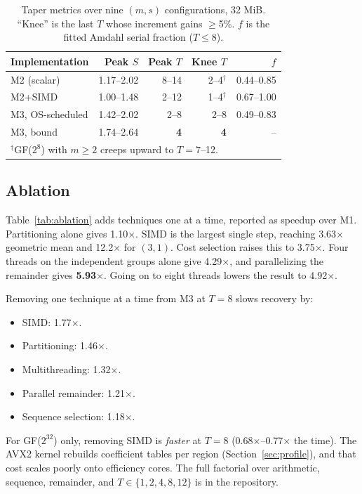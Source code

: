 \documentclass[conference]{IEEEtran}
\begin{document}
\begin{table}[t]
\caption{Taper metrics over nine $(m,s)$ configurations, 32 MiB. ``Knee'' is the last $T$ whose increment gains $\ge$5\%. $f$ is the fitted Amdahl serial fraction ($T\le8$).}
\label{tab:taper}
\centering
\footnotesize
\setlength{\tabcolsep}{3pt}
\begin{tabular}{l rrrr}
\hline
Implementation & Peak $S$ & Peak $T$ & Knee $T$ & $f$\\
\hline
M2 (scalar) & 1.17--2.02 & 8--14 & 2--4$^\dagger$ & 0.44--0.85\\
M2+SIMD & 1.00--1.48 & 2--12 & 1--4$^\dagger$ & 0.67--1.00\\
M3, OS-scheduled & 1.42--2.02 & 2--8 & 2--8 & 0.49--0.83\\
M3, bound & 1.74--2.64 & \textbf{4} & \textbf{4} & --\\
\hline
\multicolumn{5}{l}{$^\dagger$GF($2^8$) with $m\ge2$ creeps upward to $T=7$--12.}\\
\end{tabular}
\end{table}

\subsection{Ablation}
Table~\ref{tab:ablation} adds techniques one at a time, reported as speedup over M1. Partitioning alone gives 1.10$\times$. SIMD is the largest single step, reaching 3.63$\times$ geometric mean and 12.2$\times$ for $(3,1)$. Cost selection raises this to 3.75$\times$. Four threads on the independent groups alone give 4.29$\times$, and parallelizing the remainder gives \textbf{5.93$\times$}. Going on to eight threads lowers the result to 4.92$\times$.

Removing one technique at a time from M3 at $T=8$ slows recovery by:
\begin{itemize}
\item SIMD: 1.77$\times$.
\item Partitioning: 1.46$\times$.
\item Multithreading: 1.32$\times$.
\item Parallel remainder: 1.21$\times$.
\item Sequence selection: 1.18$\times$.
\end{itemize}
For GF($2^{32}$) only, removing SIMD is \emph{faster} at $T=8$ (0.68$\times$--0.77$\times$ the time). The AVX2 kernel rebuilds coefficient tables per region (Section~\ref{sec:profile}), and that cost scales poorly onto efficiency cores. The full factorial over arithmetic, sequence, remainder, and $T\in\{1,2,4,8,12\}$ is in the repository.
\end{document}
